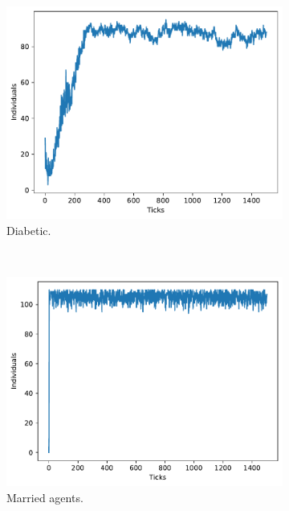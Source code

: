 \begin{figure}
\begin{subfigure}[b]{0.3\columnwidth}
            \centering 
            \includegraphics[width=1\columnwidth]{files/results-diabetes.pdf}
            \caption{Diabetic.}
            \label{subfig:sol}
        \end{subfigure}\\
        \begin{subfigure}[b]{0.3\columnwidth}
            \centering 
            \includegraphics[width=1\columnwidth]{files/results-married.pdf}
            \caption{Married agents.}
            \label{subfig:sol}
        \end{subfigure}
        \begin{subfigure}[b]{0.3\columnwidth}
            \centering 

\end{subfigure}
\end{figure}
